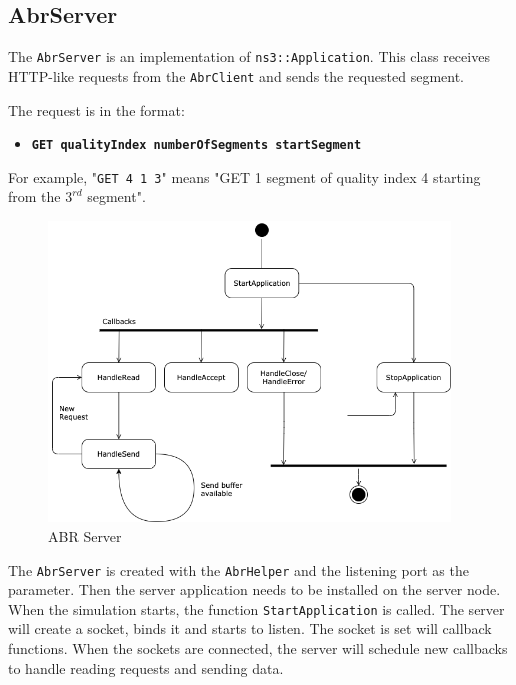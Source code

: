 \subsection{AbrServer}

The \texttt{AbrServer} is an implementation of \texttt{ns3::Application}. This class 
receives HTTP-like requests from the \texttt{AbrClient} and sends the requested segment.

The request is in the format:

\begin{itemize}[noitemsep, topsep=0pt]
  \centering
  \item[] \texttt{\textbf{GET qualityIndex numberOfSegments startSegment}}
\end{itemize}

For example, "\texttt{GET 4 1 3}" means "GET 1 segment of quality index 4 starting from the 
${3^{rd}}$ segment".


\begin{figure}[h]
  \centering
  \includegraphics[width=0.95\textwidth]{img/abrserver.png}
  \caption{ABR Server}
  \label{fig:abrserver}
\end{figure}


The \texttt{AbrServer} is created with the \texttt{AbrHelper} and the listening port as the 
parameter. Then the
server application needs to be installed on the server node. When the simulation starts, the 
function \texttt{StartApplication} is called. The server will create a socket, binds it and starts
to listen.
The socket is set will callback functions. When the sockets are connected, the server 
will schedule new callbacks to handle reading requests and sending data.


